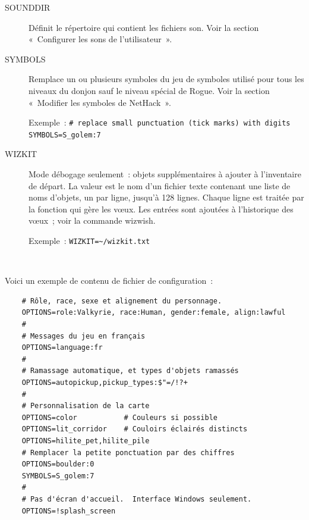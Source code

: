 \documentclass[titlepage]{article}
\begin{document}
\begin{description}
\item[{SOUNDDIR}]
Définit le répertoire qui contient les fichiers son.
Voir la section «~Configurer les sons de l'utilisateur~».

\item[{SYMBOLS}]
Remplace un ou plusieurs symboles du jeu de symboles utilisé pour tous les
niveaux du donjon sauf le niveau spécial de Rogue.
Voir la section «~Modifier les symboles de NetHack~».


Exemple~:
\texttt{\# replace small punctuation (tick marks) with digits}\\
\texttt{SYMBOLS=S\_golem:7}\\

\item[{WIZKIT}]
Mode débogage seulement~: objets supplémentaires à ajouter à l'inventaire
de départ.
La valeur est le nom d'un fichier texte contenant une liste de noms
d'objets, un par ligne, jusqu'à 128 lignes.
Chaque ligne est traitée par la fonction qui gère les vœux.
Les entrées sont ajoutées à l'historique des vœux~; voir la commande
wizwish.


Exemple~:
\texttt{WIZKIT=\textasciitilde{}/wizkit.txt} \\

\end{description}

~


Voici un exemple de contenu de fichier de configuration~:\\
\begin{verbatim}
    # Rôle, race, sexe et alignement du personnage.
    OPTIONS=role:Valkyrie, race:Human, gender:female, align:lawful
    #
    # Messages du jeu en français
    OPTIONS=language:fr
    #
    # Ramassage automatique, et types d'objets ramassés
    OPTIONS=autopickup,pickup_types:$"=/!?+
    #
    # Personnalisation de la carte
    OPTIONS=color           # Couleurs si possible
    OPTIONS=lit_corridor    # Couloirs éclairés distincts
    OPTIONS=hilite_pet,hilite_pile
    # Remplacer la petite ponctuation par des chiffres
    OPTIONS=boulder:0
    SYMBOLS=S_golem:7
    #
    # Pas d'écran d'accueil.  Interface Windows seulement.
    OPTIONS=!splash_screen
\end{verbatim}


~
\end{document}
